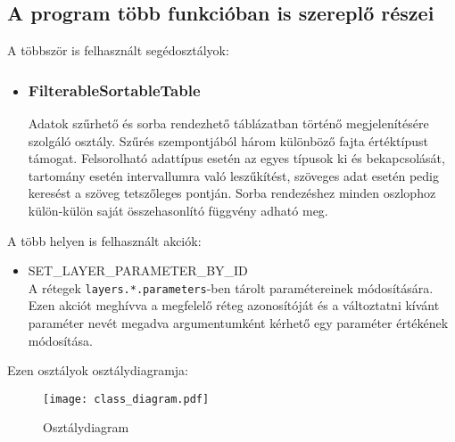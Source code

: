 \subsection{A program több funkcióban is szereplő részei}

\noindent A többször is felhasznált segédosztályok:

\begin{itemize}

\item\subsubsection{FilterableSortableTable}
Adatok szűrhető és sorba rendezhető táblázatban történő megjelenítésére szolgáló
osztály. Szűrés szempontjából három különböző fajta értéktípust támogat.
Felsorolható adattípus esetén az egyes típusok ki és bekapcsolását, tartomány
esetén intervallumra való leszűkítést, szöveges adat esetén pedig keresést a
szöveg tetszőleges pontján. Sorba rendezéshez minden oszlophoz külön-külön saját
összehasonlító függvény adható meg.

\end{itemize}

\noindent A több helyen is felhasznált akciók:
\begin{itemize}

\item SET\_LAYER\_PARAMETER\_BY\_ID \\
A rétegek \verb|layers.*.parameters|-ben tárolt paramétereinek módosítására.
Ezen akciót meghívva a megfelelő réteg azonosítóját és a változtatni kívánt
paraméter nevét megadva argumentumként kérhető egy paraméter értékének
módosítása.

\end{itemize}

Ezen osztályok osztálydiagramja:

\begin{figure}[H]
  \texttt{[image: class\_diagram.pdf]}
  \caption{Osztálydiagram}
  \label{fig:class_diagram}
\end{figure}
